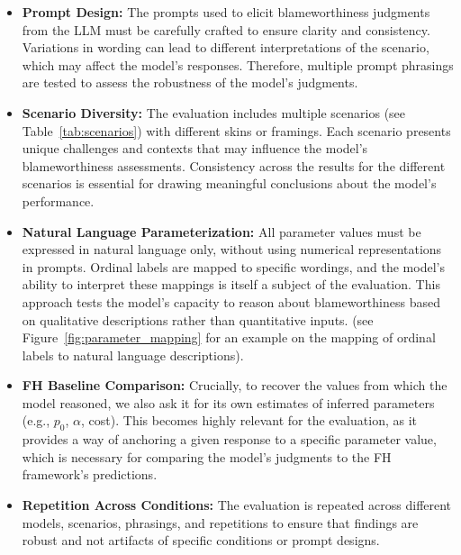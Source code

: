 \documentclass{article}
\begin{document}
\begin{itemize}
  \item \textbf{Prompt Design:} The prompts used to elicit blameworthiness judgments from the LLM must be carefully crafted to ensure clarity and consistency. Variations in wording can lead to different interpretations of the scenario, which may affect the model's responses. Therefore, multiple prompt phrasings are tested to assess the robustness of the model's judgments. 
  
  \item \textbf{Scenario Diversity:} The evaluation includes multiple scenarios (see Table~\ref{tab:scenarios}) with different skins or framings. Each scenario presents unique challenges and contexts that may influence the model's blameworthiness assessments. Consistency across the results for the different scenarios is essential for drawing meaningful conclusions about the model's performance.
  
  \item \textbf{Natural Language Parameterization:} All parameter values must be expressed in natural language only, without using numerical representations in prompts. Ordinal labels are mapped to specific wordings, and the model's ability to interpret these mappings is itself a subject of the evaluation. This approach tests the model's capacity to reason about blameworthiness based on qualitative descriptions rather than quantitative inputs. (see Figure~\ref{fig:parameter_mapping} for an example on the mapping of ordinal labels to natural language descriptions).
  
  \item \textbf{FH Baseline Comparison:} Crucially, to recover the values from which the model reasoned, we also ask it for its own estimates of inferred parameters (e.g., $p_0$, $\alpha$, cost). This becomes highly relevant for the evaluation, as it provides a way of anchoring a given response to a specific parameter value, which is necessary for comparing the model's judgments to the FH framework's predictions.
  
  \item \textbf{Repetition Across Conditions:} The evaluation is repeated across different models, scenarios, phrasings, and repetitions to ensure that findings are robust and not artifacts of specific conditions or prompt designs.
\end{itemize}
\end{document}
